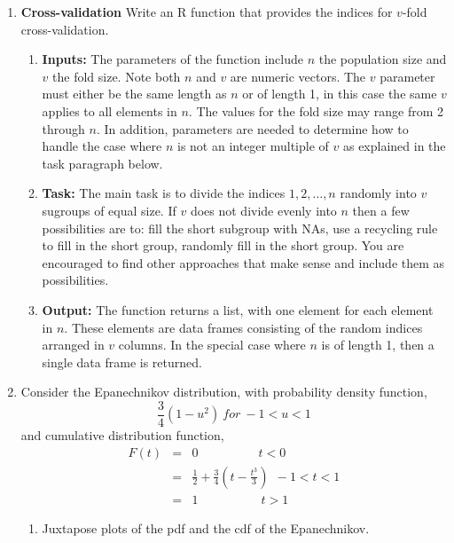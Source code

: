\begin{enumerate}

\item \textbf{Cross-validation}
Write an R function that provides the indices for $v$-fold cross-validation.

\begin{enumerate} 
\item \textbf{Inputs:} The parameters of the function include $n$ the
population size and $v$ the fold size.
Note both $n$ and $v$ are numeric vectors. The $v$ parameter must either be
the same length as $n$ or of length 1, in this case the same $v$ applies to
all elements in $n$.
The values for the fold size may range from 2 through $n$.
In addition, parameters are needed to determine how to handle
the case where $n$ is not an integer multiple of $v$ as explained
in the task paragraph below.

\item \textbf{Task:}
The main task is to divide the indices $1,2, \ldots ,n$
randomly into $v$ sugroups of equal size.  
If $v$ does not divide evenly into $n$ then a few possibilities are
to: fill the short subgroup with NAs, use a recycling rule to fill in
the short group, randomly fill in the short group.  You are encouraged
to find other approaches that make sense and include them as possibilities.

\item \textbf{Output:} The function returns a list, with one element
for each element in $n$.  These elements are data frames consisting
of the random indices arranged in $v$ columns. 
In the special case where $n$ is of length 1, then a single data frame
is returned.
\end{enumerate}


\item\label{prob:epa}
Consider the  Epanechnikov distribution, with probability
density function,
$$
\frac{3}{4}(1-u^2) ~ for~ -1<u<1
$$
and cumulative distribution function,
\begin{eqnarray*}
F(t) &=& 0 ~~~~~~~~~~~~~~~~~~~~~~ t < 0\\
 & = & \frac {1}{2} + \frac{3}{4} (t - \frac{t^3}{3}) ~~-1 < t  <1\\
  &=& 1 ~~~~~~~~~~~~~~~~~~~~~~~ t > 1
\end{eqnarray*}

\begin{enumerate}
\item Juxtapose plots of the pdf and the cdf of the Epanechnikov.


\end{enumerate}
\end{enumerate}

